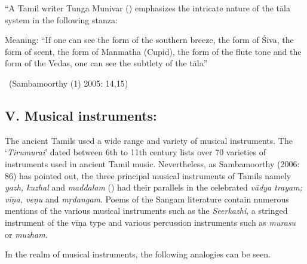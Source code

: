 \begin{myquote}
“A Tamil writer Tunga Munivar () emphasizes the intricate nature of the tāla system in the following stanza:
\end{myquote}

\begin{myquote}
\end{myquote}

\begin{myquote}
Meaning: “If one can see the form of the southern breeze, the form of Śiva, the form of scent, the form of Manmatha (Cupid), the form of the flute tone and the form of the Vedas, one can see the subtlety of the tāla”

~\hfill (Sambamoorthy (1) 2005: 14,15)
\end{myquote}


\subsection*{V. Musical instruments:}

The ancient Tamils used a wide range and variety of musical instruments. The ‘\textit{Tirumurai}’ dated between 6th to 11th century lists over 70 varieties of instruments used in ancient Tamil music. Nevertheless, as Sambamoorthy (2006: 86) has pointed out, the three principal musical instruments of Tamils namely \textit{yazh, kuzhal} and \textit{maddalam} () had their parallels in the celebrated \textit{vādya trayam; vīṇa, veṇu} and \textit{mṛdangam}. Poems of the Sangam literature contain numerous mentions of the various musical instruments such as the \textit{Seerkazhi}, a stringed instrument of the vīṇa type and various percussion instruments such as \textit{murasu} or \textit{muzham}.

In the realm of musical instruments, the following analogies can be seen.

